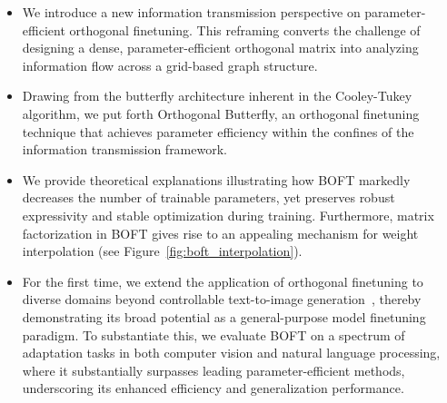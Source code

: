 \begin{itemize}[leftmargin=*,nosep]
    \item We introduce a new information transmission perspective on parameter-efficient orthogonal finetuning. This reframing converts the challenge of designing a dense, parameter-efficient orthogonal matrix into analyzing information flow across a grid-based graph structure.
    \item Drawing from the butterfly architecture inherent in the Cooley-Tukey algorithm, we put forth Orthogonal Butterfly, an orthogonal finetuning technique that achieves parameter efficiency within the confines of the information transmission framework.
    \item We provide theoretical explanations illustrating how BOFT markedly decreases the number of trainable parameters, yet preserves robust expressivity and stable optimization during training. Furthermore, matrix factorization in BOFT gives rise to an appealing mechanism for weight interpolation (see Figure~\ref{fig:boft_interpolation}).
    \item For the first time, we extend the application of orthogonal finetuning to diverse domains beyond controllable text-to-image generation~\cite{qiu2023controlling}, thereby demonstrating its broad potential as a general-purpose model finetuning paradigm. To substantiate this, we evaluate BOFT on a spectrum of adaptation tasks in both computer vision and natural language processing, where it substantially surpasses leading parameter-efficient methods, underscoring its enhanced efficiency and generalization performance.
\end{itemize}


